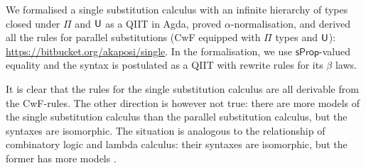 \documentclass{easychair}
\begin{document}
We formalised a single substitution calculus with an infinite hierarchy
of types closed under $\Pi$ and $\mathsf{U}$ as a QIIT in Agda, proved
$\alpha$-normalisation, and derived all the rules for parallel
substitutions (CwF equipped with $\Pi$ types and $\mathsf{U}$):
\url{https://bitbucket.org/akaposi/single}. In the formalisation, we
use $\mathsf{sProp}$-valued equality and the syntax is postulated as a
QIIT with rewrite rules for its $\beta$ laws.

It is clear that the rules for the single substitution calculus are
all derivable from the CwF-rules. The other direction is however not
true: there are more models of the single substitution calculus than
the parallel substitution calculus, but the syntaxes are
isomorphic. The situation is analogous to the relationship of
combinatory logic and lambda calculus: their syntaxes are isomorphic,
but the former has more models \cite{DBLP:conf/fscd/AltenkirchKSV23}.

\label{sect:bib}

%
%
%


\end{document}
